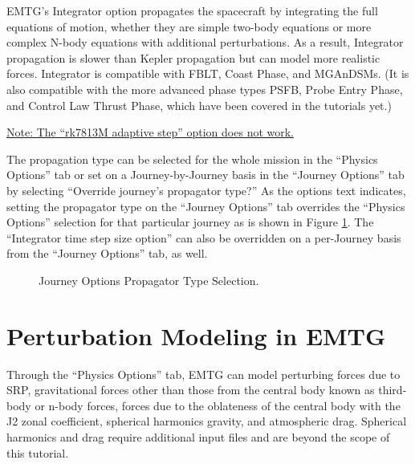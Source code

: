 \documentclass[11pt]{article}
\makeatletter
\newcommand{\knownissuelabel}[2]
{
	 \phantomsection
  	\hyperref[#2_h]{#1}\def\@currentlabel{\unexpanded{#1}}\label{#2_b}
}
\makeatother
\begin{document}
\noindent \ac{EMTG}’s Integrator option propagates the spacecraft by integrating the full equations of motion, whether they are simple two-body equations or more complex N-body equations with additional perturbations. As a result, Integrator propagation is slower than Kepler propagation but can model more realistic forces. Integrator is compatible with \ac{FBLT}, Coast Phase, and \ac{MGAnDSMs}. (It is also compatible with the more advanced phase types \ac{PSFB}, Probe Entry Phase, and Control Law Thrust Phase, which have been covered in the tutorials yet.) 

\noindent \knownissuelabel{Note: The “rk7813M adaptive step” option does not work.}{broken_integrator_issue}

\noindent The propagation type can be selected for the whole mission in the ``Physics Options'' tab or set on a Journey-by-Journey basis in the ``Journey Options'' tab by selecting ``Override journey’s propagator type?'' As the options text indicates, setting the propagator type on the ``Journey Options'' tab overrides the ``Physics Options'' selection for that particular journey as is shown in Figure \ref{fig:propagator_type_selection}. The ``Integrator time step size option'' can also be overridden on a per-Journey basis from the ``Journey Options'' tab, as well.

\begin{figure}
	\centering
	\caption{\label{fig:propagator_type_selection}Journey Options Propagator Type Selection.}
\end{figure}


\section{Perturbation Modeling in EMTG}
\label{sec:perturbation_modeling_in_emtg}

Through the ``Physics Options'' tab, \ac{EMTG} can model perturbing forces due to \ac{SRP}, gravitational forces other than those from the central body known as third-body or n-body forces, forces due to the oblateness of the central body with the J2 zonal coefficient, spherical harmonics gravity, and atmospheric drag. Spherical harmonics and drag require additional input files and are beyond the scope of this tutorial.
\end{document}
